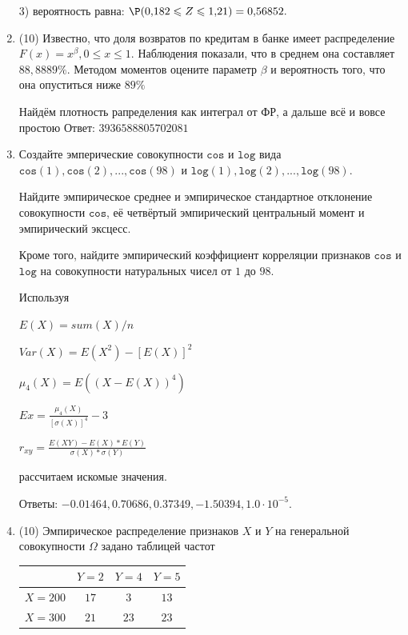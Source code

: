 \documentclass[a4paper,14pt]{article}
\begin{document}
\begin{enumerate}
3) вероятность равна:
$
\P(0,\!182\leqslant Z\leqslant 1,\!21)=
0,\!56852.
$


\item


(10) Известно, что доля возвратов по кредитам в банке имеет распределение $F(x) = x ^{\beta}, 0 \leqslant x \leqslant 1$.
Наблюдения показали, что в среднем она составляет $88,8889\%$. Методом моментов оцените параметр $\beta$ и
вероятность того, что она опуститься ниже $89\%$




Найдём плотность рапределения как интеграл от ФР, а дальше всё и вовсе простою Ответ: $3936588805702081$


\item

    
    Создайте эмперические совокупности  $\mathtt{\text{cos}}$ и $\mathtt{\text{log}}$ вида $\mathtt{\text{cos}}(1),\mathtt{\text{cos}}(2), ..., \mathtt{\text{cos}}(98) $ и $\mathtt{\text{log}}(1),\mathtt{\text{log}}(2), ..., \mathtt{\text{log}}(98). $

    Найдите эмпирическое среднее и эмпирическое стандартное отклонение совокупности $\mathtt{\text{cos}}$, её четвёртый эмпирический центральный момент и эмпирический эксцесс.

    Кроме того, найдите эмпирический коэффициент корреляции признаков $\mathtt{\text{cos}}$ и $\mathtt{\text{log}}$ на совокупности натуральных чисел от $1$ до $98$.
    


    
    Используя

	$E(X) = sum(X) / n$

	$Var(X) = E(X^2) - [E(X)]^2$

	$\mu_4(X) = E((X-E(X))^4)$

	$Ex = \frac{\mu_4(X)}{[\sigma(X)]^4} - 3$

	$r_{xy} = \frac{E(XY) - E(X) * E(Y)}{\sigma(X) * \sigma(Y)}$

    рассчитаем искомые значения.

    Ответы: $-0.01464, 0.70686, 0.37349, -1.50394, 1.0 \cdot 10^{-5}$.

    

\item


(10) Эмпирическое распределение признаков $X$ и $Y$ на генеральной совокупности $\Omega$ задано таблицей частот  
 
\begin{tabular}{ | c | c | c | c | }
\hline
 & $Y = 2$ & $Y = 4$ & $Y = 5$  \\ \hline
$X = 200$ & $17$ & $3$ & $13$\\ \hline
$X = 300$ & $21$ & $23$ & $23$\\
\hline
\end{tabular}


\end{enumerate}
\end{document}
